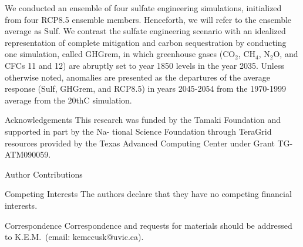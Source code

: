 \documentclass{nature}
\begin{document}
\begin{methods}
We conducted an ensemble of four sulfate engineering simulations, initialized from four RCP8.5 ensemble members. Henceforth, we will refer to the ensemble average as Sulf. We contrast the sulfate engineering scenario with an idealized representation of complete mitigation and carbon sequestration by conducting one simulation, called GHGrem, in which greenhouse gases (CO$_2$, CH$_4$, N$_2$O, and CFCs 11 and 12) are abruptly set to year 1850 levels in the year 2035. Unless otherwise noted, anomalies are presented as the departures of the average response (Sulf, GHGrem, and RCP8.5) in years 2045-2054 from the 1970-1999 average from the 20thC simulation.%

\end{methods}





%




\begin{addendum}
\item[Acknowledgements] This research was funded by the Tamaki Foundation and supported in part by the Na- tional Science Foundation through TeraGrid resources provided by the Texas Advanced Computing Center under Grant TG-ATM090059.
\item[Author Contributions] 
 \item[Competing Interests] The authors declare that they have no competing financial interests.
\item[Correspondence] Correspondence and requests for materials should be addressed to K.E.M.~(email: kemccusk@uvic.ca).
\end{addendum}

\end{document}
